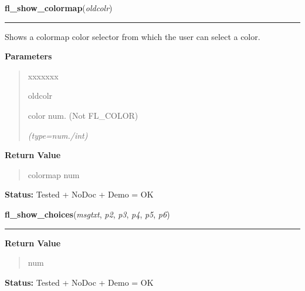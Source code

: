 \hspace{.8\funcindent}\begin{boxedminipage}{\funcwidth}

    \raggedright \textbf{fl\_show\_colormap}(\textit{oldcolr})

    \vspace{-1.5ex}

    \rule{\textwidth}{0.5\fboxrule}
\setlength{\parskip}{2ex}
    Shows a colormap color selector from which the user can select a color.

\setlength{\parskip}{1ex}
      \textbf{Parameters}
      \vspace{-1ex}

      \begin{quote}
        \begin{Ventry}{xxxxxxx}

          \item[oldcolr]

          color num. (Not FL\_COLOR)

            {\it (type=num./int)}

        \end{Ventry}

      \end{quote}

      \textbf{Return Value}
    \vspace{-1ex}

      \begin{quote}
      colormap num

      \end{quote}

\textbf{Status:} Tested + NoDoc + Demo = OK



    \end{boxedminipage}

    \label{xformslib:flgoodies:fl_show_choices}

    \vspace{0.5ex}

\hspace{.8\funcindent}\begin{boxedminipage}{\funcwidth}

    \raggedright \textbf{fl\_show\_choices}(\textit{msgtxt}, \textit{p2}, \textit{p3}, \textit{p4}, \textit{p5}, \textit{p6})

    \vspace{-1.5ex}

    \rule{\textwidth}{0.5\fboxrule}
\setlength{\parskip}{2ex}
\setlength{\parskip}{1ex}
      \textbf{Return Value}
    \vspace{-1ex}

      \begin{quote}
      num

      \end{quote}

\textbf{Status:} Tested + NoDoc + Demo = OK



    \end{boxedminipage}

